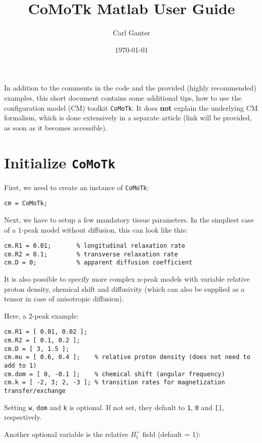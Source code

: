 \documentclass[a4paper,10pt]{article}
\author{Carl Ganter}
\date{\today}
\title{CoMoTk Matlab User Guide}
\begin{document}
\maketitle
In addition to the comments in the code and the provided (highly recommended) examples, 
this short document contains some additional tips, how to use the configuration model (CM) toolkit
\texttt{CoMoTk}. It does \textbf{not} explain the underlying CM formalism, which is done extensively
in a separate article (link will be provided, as soon as it becomes accessible).  

\section{Initialize \texttt{CoMoTk}}
\label{sec:orgdda15da}
First, we need to create an instance of \texttt{CoMoTk}:

\begin{verbatim}
cm = CoMoTk;
\end{verbatim}

Next, we have to setup a few mandatory tissue parameters. In the simpliest case
of a 1-peak model without diffusion, this can look like this:

\begin{verbatim}
cm.R1 = 0.01;       % longitudinal relaxation rate
cm.R2 = 0.1;        % transverse relaxation rate
cm.D = 0;           % apparent diffusion coefficient
\end{verbatim}

It is also possible to specify more complex n-peak models with variable relative 
proton density, chemical shift and diffusivity (which can also be supplied as a tensor in case of anisotropic diffusion). 

Here, a 2-peak example:

\begin{verbatim}
cm.R1 = [ 0.01, 0.02 ];
cm.R2 = [ 0.1, 0.2 ];
cm.D = [ 3, 1.5 ];
cm.mu = [ 0.6, 0.4 ];    % relative proton density (does not need to add to 1)
cm.dom = [ 0, -0.1 ];    % chemical shift (angular frequency)
cm.k = [ -2, 3; 2, -3 ]; % transition rates for magnetization transfer/exchange
\end{verbatim}

Setting \texttt{w}, \texttt{dom} and \texttt{k} is optional. If not set, they default to \texttt{1}, \texttt{0} and \texttt{[]}, respectively.

Another optional variable is the relative \(B_1^+\) field (default = 1):
\end{document}
